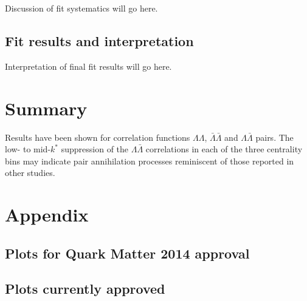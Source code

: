 Discussion of fit systematics will go here.

\subsection{Fit results and interpretation}
\label{sec:FitResults}

Interpretation of final fit results will go here.

\section{Summary}
Results have been shown for correlation functions $\Lambda\Lambda$, $\bar{\Lambda}\bar{\Lambda}$ and $\Lambda\bar{\Lambda}$ pairs.  The low- to mid-$k^*$ suppression of the $\Lambda\bar{\Lambda}$ correlations in each of the three centrality bins may indicate pair annihilation processes reminiscent of those reported in other studies.

\section{Appendix}
\subsection{Plots for Quark Matter 2014 approval}

\subsection{Plots currently approved}









%